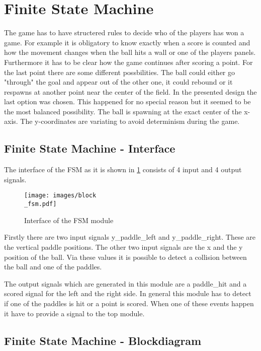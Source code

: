 \newpage
\section{Finite State Machine}
The game has to have structered rules to decide who of the players has won a game. For example it is obligatory to know exactly when a score is counted and how the movement changes when the ball hits a wall or one of the players panels. Furthermore it has to be clear how the game continues after scoring a point. \newline 
For the last point there are some different possbilities. The ball could either go "through" the goal and appear out of the other one, it could rebound or it respawns at another point near the center of the field. In the presented design the last option was chosen. This happened for no special reason but it seemed to be the most balanced possibility. The ball is spawning at the exact center of the x-axis. The y-coordinates are variating to avoid determinism during the game.  

\subsection{Finite State Machine - Interface}
The interface of the FSM as it is shown in \ref{interface\_fsm} consists of 4 input and 4 output signals. 
\begin{figure}[h]
	\texttt{[image: images/block\\\_fsm.pdf]}

\caption{Interface of the FSM module}
\label{interface\_fsm}
\end{figure}

Firstly there are two input signals y\_paddle\_left and y\_paddle\_right. These are the vertical paddle positions. The other two input signals are the x and the y position of the ball. Via these values it is possible to detect a collision between the ball and one of the paddles.\newline 

The output signals which are generated in this module are a paddle\_hit and a scored signal for the left and the right side. In general this module has to detect if one of the paddles is hit or a point is scored. When one of these events happen it have to provide a signal to the top module.


\subsection{Finite State Machine - Blockdiagram}

